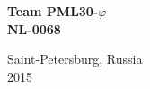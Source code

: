 \begin{titlepage}
\begin{center}
		\vspace{1em}
		
		\bf\fontsize{50}{60}\selectfont Team PML30-${\varphi}$ \\ NL-0068 \fontsize{11}{13}\selectfont
			
		\vspace{8em}
		
		\begin{figure}[H]
		\end{figure}
			
		\LARGE\normalfont Saint-Petersburg, Russia	\\ 2015
	\end{center}
\end{titlepage}

\newpage

